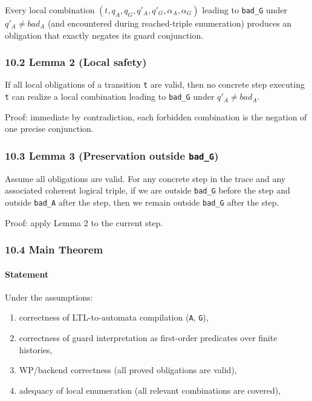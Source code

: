 \documentclass[
]{article}
\providecommand{\tightlist}{%
  \setlength{\itemsep}{0pt}\setlength{\parskip}{0pt}}
\begin{document}
Every local combination \((t,q_A,q_G,q'_A,q'_G,\alpha_A,\alpha_G)\)
leading to \texttt{bad\_G} under \(q'_A \neq bad_A\) (and encountered
during reached-triple enumeration) produces an obligation that exactly
negates its guard conjunction.

\subsubsection{10.2 Lemma 2 (Local safety)}\label{lemma-2-local-safety}

If all local obligations of a transition \texttt{t} are valid, then no
concrete step executing \texttt{t} can realize a local combination
leading to \texttt{bad\_G} under \(q'_A \neq bad_A\).

Proof: immediate by contradiction, each forbidden combination is the
negation of one precise conjunction.

\subsubsection{\texorpdfstring{10.3 Lemma 3 (Preservation outside
\texttt{bad\_G})}{10.3 Lemma 3 (Preservation outside bad\_G)}}\label{lemma-3-preservation-outside-bad_g}

Assume all obligations are valid. For any concrete step in the trace and
any associated coherent logical triple, if we are outside
\texttt{bad\_G} before the step and outside \texttt{bad\_A} after the
step, then we remain outside \texttt{bad\_G} after the step.

Proof: apply Lemma 2 to the current step.

\subsubsection{10.4 Main Theorem}\label{main-theorem}

\paragraph{Statement}\label{statement}

Under the assumptions:

\begin{enumerate}
\def\labelenumi{\arabic{enumi}.}
\tightlist
\item
  correctness of LTL-to-automata compilation (\texttt{A}, \texttt{G}),
\item
  correctness of guard interpretation as first-order predicates over
  finite histories,
\item
  WP/backend correctness (all proved obligations are valid),
\item
  adequacy of local enumeration (all relevant combinations are covered),
\end{enumerate}
\end{document}
